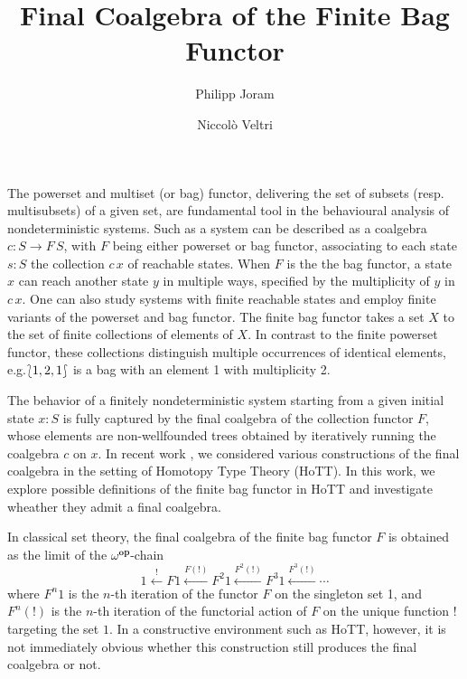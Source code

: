 \documentclass{easychair}
\begin{document}
  \title{Final Coalgebra of the Finite Bag Functor}
  \author{%
      Philipp Joram \and
      Niccol{\`o} Veltri%
  }

  \maketitle

  The powerset and multiset (or bag) functor, delivering the set of
  subsets (resp. multisubsets) of a given set, are fundamental tool in
  the behavioural analysis of nondeterministic systems. Such as a
  system can be described as a coalgebra $c : S \to F\, S$, with $F$
  being either powerset or bag functor, associating to each state $s :
  S$ the collection $c \, x$ of reachable states. When $F$ is the the
  bag functor, a state $x$ can reach another state $y$ in multiple
  ways, specified by the multiplicity of $y$ in $c\,x$. One can also
  study systems with finite reachable states and employ finite
  variants of the powerset and bag functor.  The finite bag functor
  takes a set $X$ to the set of finite collections of elements of
  $X$.  In contrast to the finite powerset functor, these collections
  distinguish multiple occurrences of identical elements, e.g.\@ $\Bag[1,
    2, 1]$ is a bag with an element 1 with multiplicity 2.
  
  The behavior of a finitely nondeterministic system starting from a
  given initial state $x : S$ is fully captured by the final coalgebra
  of the collection functor $F$, whose elements are non-wellfounded
  trees obtained by iteratively running the coalgebra $c$ on $x$. In
  recent work \cite{Veltri2021}, we considered various constructions
  of the final coalgebra in the setting of Homotopy Type Theory
  (HoTT). In this work, we explore possible definitions of the finite
  bag functor in HoTT and investigate wheather they admit a final coalgebra.

  In classical set theory, the final coalgebra of the finite bag
  functor $F$ is obtained as the limit of the
  $\omega^{\operatorname{\mathbf{op}}}$-chain
  \cite[{Ch. 3.3.13}]{Adamek2021}
  \begin{equation}\label{eq:chain}
    1 \xleftarrow{!} {F 1}
      \xleftarrow{F(!)} {F^2 1}
      \xleftarrow{F^2(!)} {F^3 1}
      \xleftarrow{F^3(!)}
      \cdots
  \end{equation}
  where $F^n 1$ is the $n$-th iteration of the functor $F$ on the
  singleton set 1, and $F^n(!)$ is the $n$-th iteration of the
  functorial action of $F$ on the unique function $!$ targeting the set
  $1$. In a constructive environment such as HoTT, however, it is not
  immediately obvious whether this construction still produces the
  final coalgebra or not.
\end{document}
